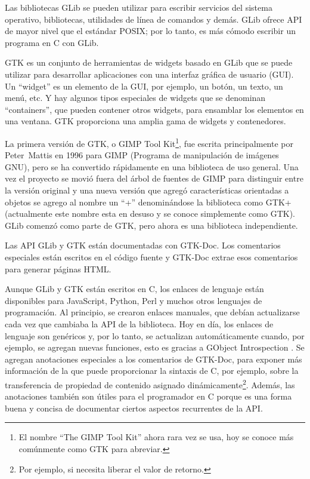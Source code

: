 Las bibliotecas GLib se pueden utilizar para escribir servicios del sistema operativo, bibliotecas, utilidades de línea de comandos y demás. GLib ofrece API de mayor nivel que el estándar POSIX; por lo tanto, es más cómodo escribir un programa en C con GLib.

GTK es un conjunto de herramientas de widgets basado en GLib que se puede utilizar para desarrollar aplicaciones con una interfaz gráfica de usuario (GUI). Un ``widget'' es un elemento de la GUI, por ejemplo, un botón, un texto, un menú, etc. Y hay algunos tipos especiales de widgets que se denominan ``containers'', que pueden contener otros widgets, para ensamblar los elementos en una ventana. GTK proporciona una amplia gama de widgets y contenedores.

La primera versión de GTK, o GIMP Tool Kit\footnote{El nombre ``The GIMP Tool Kit'' ahora rara vez se usa, hoy se conoce más comúnmente como GTK para abreviar.}, fue escrita principalmente por Peter~Mattis en 1996 para GIMP (Programa de manipulación de imágenes GNU), pero se ha convertido rápidamente en una biblioteca de uso general. Una vez el proyecto se movió fuera del árbol de fuentes de GIMP para distinguir entre la versión original y una nueva versión que agregó características orientadas a objetos se agrego al nombre un ``+'' denominándose la biblioteca como GTK+ (actualmente este nombre esta en desuso y se conoce simplemente como GTK). GLib comenzó como parte de GTK, pero ahora es una biblioteca independiente.

Las API GLib y GTK están documentadas con GTK-Doc. Los comentarios especiales están escritos en el código fuente y GTK-Doc extrae esos comentarios para generar páginas HTML.

Aunque GLib y GTK están escritos en C, los enlaces de lenguaje están disponibles para JavaScript, Python, Perl y muchos otros lenguajes de programación. Al principio, se crearon enlaces manuales, que debían actualizarse cada vez que cambiaba la API de la biblioteca. Hoy en día, los enlaces de lenguaje son genéricos y, por lo tanto, se actualizan automáticamente cuando, por ejemplo, se agregan nuevas funciones, esto es gracias a GObject Introspection . Se agregan anotaciones especiales a los comentarios de GTK-Doc, para exponer más información de la que puede proporcionar la sintaxis de C, por ejemplo, sobre la transferencia de propiedad de contenido asignado dinámicamente\footnote{Por ejemplo, si necesita liberar el valor de retorno.}. Además, las anotaciones también son útiles para el programador en C porque es una forma buena y concisa de documentar ciertos aspectos recurrentes de la API.

